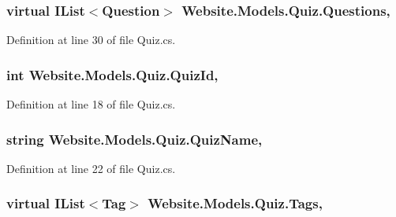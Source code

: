 \subsubsection[{Questions}]{\setlength{\rightskip}{0pt plus 5cm}virtual I\+List$<${\bf Question}$>$ Website.\+Models.\+Quiz.\+Questions\hspace{0.3cm}{\ttfamily [get]}, {\ttfamily [set]}}\label{class_website_1_1_models_1_1_quiz_aa22a3b0df8db88169563c55a556df786}


Definition at line 30 of file Quiz.\+cs.

\hypertarget{class_website_1_1_models_1_1_quiz_ad45c1ad69f371e83653007296a181ba9}{}
\subsubsection[{Quiz\+Id}]{\setlength{\rightskip}{0pt plus 5cm}int Website.\+Models.\+Quiz.\+Quiz\+Id\hspace{0.3cm}{\ttfamily [get]}, {\ttfamily [set]}}\label{class_website_1_1_models_1_1_quiz_ad45c1ad69f371e83653007296a181ba9}


Definition at line 18 of file Quiz.\+cs.

\hypertarget{class_website_1_1_models_1_1_quiz_a4ba28e5b4ca29b9e78105fe40c1d721d}{}
\subsubsection[{Quiz\+Name}]{\setlength{\rightskip}{0pt plus 5cm}string Website.\+Models.\+Quiz.\+Quiz\+Name\hspace{0.3cm}{\ttfamily [get]}, {\ttfamily [set]}}\label{class_website_1_1_models_1_1_quiz_a4ba28e5b4ca29b9e78105fe40c1d721d}


Definition at line 22 of file Quiz.\+cs.

\hypertarget{class_website_1_1_models_1_1_quiz_a635b59e59e81a87e4b891ba6ffc8e07d}{}
\subsubsection[{Tags}]{\setlength{\rightskip}{0pt plus 5cm}virtual I\+List$<${\bf Tag}$>$ Website.\+Models.\+Quiz.\+Tags\hspace{0.3cm}{\ttfamily [get]}, {\ttfamily [set]}}\label{class_website_1_1_models_1_1_quiz_a635b59e59e81a87e4b891ba6ffc8e07d}


